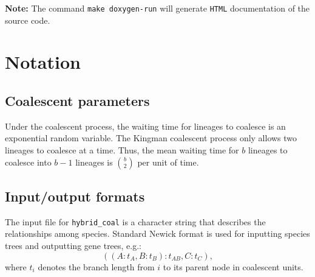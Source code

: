 {\bf Note:} The command {\tt make doxygen-run} will generate {\tt HTML} documentation of the source code.




\section{Notation}
\subsection{Coalescent parameters}
Under the coalescent process, the waiting time for lineages to coalesce is an exponential random variable. The Kingman coalescent process only allows two lineages to coalesce at a time. Thus, the mean waiting time for $b$ lineages to coalesce into $b-1$ lineages is $\binom{b}{2}$ per unit of time. 

\subsection{Input/output formats}\label{coal_man:coal_input}
The input file for {\tt hybrid\_coal} is a character string that describes the relationships among species. Standard Newick format
\citep{Olsen1990} is used for inputting species trees and outputting
gene trees, e.g.:
\begin{equation}
((A:t_A,B:t_B):t_{AB},C:t_C)\label{coal_man:no_root},
\end{equation}
where $t_i$ denotes the branch length from $i$ to its parent node in coalescent units. 
    

